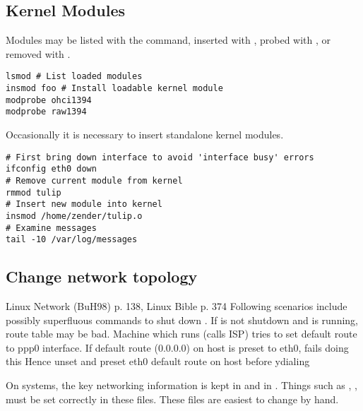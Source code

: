 \documentclass[12pt,twoside]{article}
\begin{document}
\subsection{Kernel Modules}\label{sxn:mdl}
Modules may be listed with the  command,
inserted with , probed with , or
removed with .
\begin{verbatim}
lsmod # List loaded modules
insmod foo # Install loadable kernel module
modprobe ohci1394
modprobe raw1394
\end{verbatim}
Occasionally it is necessary to insert standalone kernel modules.
\begin{verbatim}
# First bring down interface to avoid 'interface busy' errors
ifconfig eth0 down
# Remove current module from kernel
rmmod tulip
# Insert new module into kernel
insmod /home/zender/tulip.o
# Examine messages
tail -10 /var/log/messages
\end{verbatim}

\subsection{Change network topology}\label{sxn:ntw3}
Linux Network (BuH98) p. 138, Linux Bible p. 374
Following scenarios include possibly superfluous commands to shut down
.
If  is not shutdown and is running, route table may be
bad.
Machine which runs  (calls ISP) tries to set default route
to ppp0 interface.
If default route (0.0.0.0) on  host is preset to eth0,
 fails doing this 
Hence unset and preset eth0 default route on  host before
ydialing 

On  systems, the key networking information is kept in
 and in
. 
Things such as , , must be set
correctly in these files.
These files are easiest to change by hand.
\end{document}
